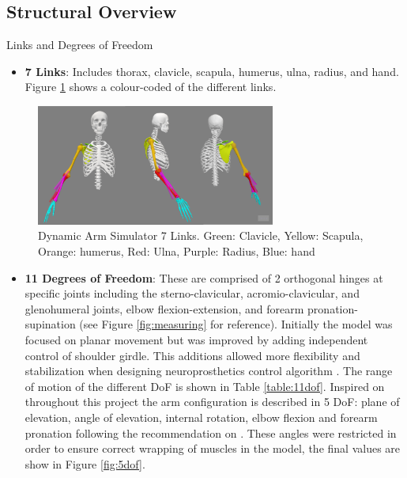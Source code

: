 \subsection{Structural Overview}
Links and Degrees of Freedom
\begin{itemize}
    \item \textbf{7 Links}: Includes thorax, clavicle, scapula, humerus, ulna, radius, and hand. Figure \ref{fig:links} shows a colour-coded of the different links. 
\end{itemize}
\begin{figure}[h!]
    \centering
    \includegraphics[width=0.7\textwidth]{Pictures/DAS/Links.png}
    \caption{Dynamic Arm Simulator 7 Links. Green: Clavicle, Yellow: Scapula, Orange: humerus, Red: Ulna, Purple: Radius, Blue: hand}
    \label{fig:links}
\end{figure}

\begin{itemize}
    \item \textbf{11 Degrees of Freedom}: These are comprised of 2 orthogonal hinges at specific joints including the sterno-clavicular, acromio-clavicular, and glenohumeral joints, elbow flexion-extension, and forearm pronation-supination (see Figure \ref{fig:measuring} for reference).  Initially the model was focused on planar movement but was improved by adding independent control of shoulder girdle. This additions allowed more flexibility and stabilization when designing neuroprosthetics control algorithm \cite{RT3D}. The range of motion of the different DoF is shown in Table \ref{table:11dof}.\newline
    Inspired on \cite{RT3D} throughout this project the arm configuration is described in 5 DoF: plane of elevation, angle of elevation, internal rotation, elbow flexion and forearm pronation following the recommendation on \cite{ISB}. These angles were restricted in order to ensure correct wrapping of muscles in the model, the final values are show in Figure \ref{fig:5dof}.
\end{itemize}


